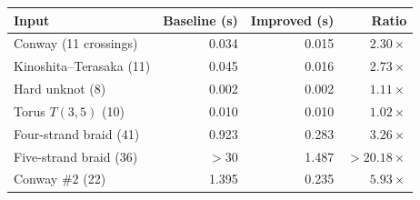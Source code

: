 \begin{tabular}{lrrr}
\toprule
Input & Baseline (s) & Improved (s) & Ratio \\
\midrule
Conway (11 crossings) & 0.034 & 0.015 & $2.30\times$ \\
Kinoshita--Terasaka (11) & 0.045 & 0.016 & $2.73\times$ \\
Hard unknot (8) & 0.002 & 0.002 & $1.11\times$ \\
Torus $T(3,5)$ (10) & 0.010 & 0.010 & $1.02\times$ \\
Four-strand braid (41) & 0.923 & 0.283 & $3.26\times$ \\
Five-strand braid (36) & $>30$ & 1.487 & $>20.18\times$ \\
Conway $\#2$ (22) & 1.395 & 0.235 & $5.93\times$ \\
\bottomrule
\end{tabular}
